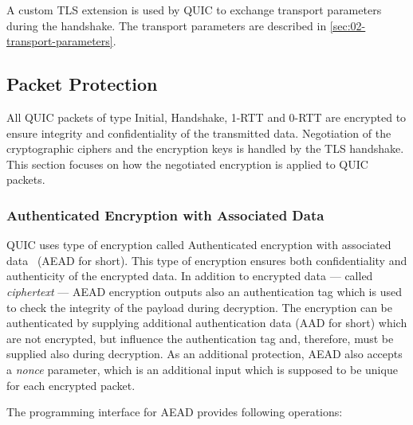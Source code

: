 A custom TLS extension is used by QUIC to exchange transport parameters during the handshake. The
transport parameters are described in \autoref{sec:02-transport-parameters}.

\subsection{Packet Protection}\label{sec:packet-protection}

All QUIC packets of type Initial, Handshake, 1-RTT and 0-RTT are encrypted to ensure integrity and
confidentiality of the transmitted data. Negotiation of the cryptographic ciphers and the encryption
keys is handled by the TLS handshake. This section focuses on how the negotiated encryption is
applied to QUIC packets.

\subsubsection{Authenticated Encryption with Associated Data}

QUIC uses type of encryption called Authenticated encryption with associated data~\cite{rfc5116}
(AEAD for short). This type of encryption ensures both confidentiality and authenticity of the
encrypted data. In addition to encrypted data --- called \textit{ciphertext} --- AEAD encryption
outputs also an authentication tag which is used to check the integrity of the payload during
decryption. The encryption can be authenticated by supplying additional authentication data (AAD for
short) which are not encrypted, but influence the authentication tag and, therefore, must be
supplied also during decryption. As an additional protection, AEAD also accepts a \textit{nonce}
parameter, which is an additional input which is supposed to be unique for each encrypted packet.

The programming interface for AEAD provides following operations:

